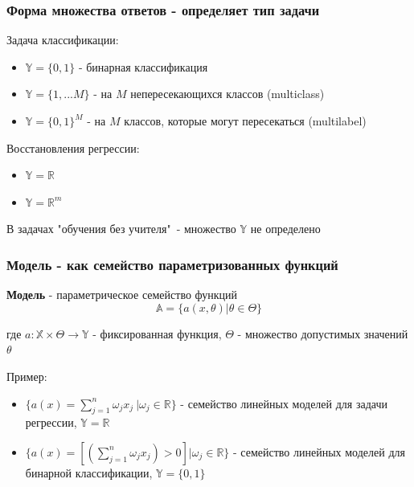 \documentclass{beamer}
\begin{document}
	
	\begin{frame}
		\frametitle{Форма множества ответов - определяет тип задачи}
		
		Задача классификации:
		\begin{itemize}
			\item $\mathbb{Y} = \{0, 1\}$ - бинарная классификация
			\item $\mathbb{Y} = \{1, ... M\}$ - на $M$ непересекающихся классов (multiclass)
			\item $\mathbb{Y} = \{0, 1\}^{M}$ - на $M$ классов, которые могут пересекаться (multilabel)
		\end{itemize}
		
		\vspace{5pt}
		
		Восстановления регрессии:
		\begin{itemize}
			\item $\mathbb{Y} = \mathbb{R}$ 
			\item $\mathbb{Y} = \mathbb{R}^{m}$
		\end{itemize}
	
		\vspace{5pt}
		
		В задачах "обучения без учителя"\ - множество $\mathbb{Y}$ не определено
	\end{frame}


	\begin{frame}
		\frametitle{Модель - как семейство параметризованных функций}
		
		\textbf{Модель} - параметрическое семейство функций
		$$
		\mathbb{A} = \{a(x, \theta) | \theta \in \Theta\}
		$$
		
		где $a: \mathbb{X} \times \Theta \to \mathbb{Y}$ - фиксированная функция,
		$\Theta$ - множество допустимых значений $\theta$
		
		\vspace{15pt}
		
		Пример:
		
		\begin{itemize}
			\item $\{a(x) = \sum_{j=1}^{n} \omega_j x_j\ | \omega_j \in \mathbb{R}\}$ - семейство линейных моделей для задачи регрессии, $\mathbb{Y} = \mathbb{R}$
			
			\item $\{a(x) = [(\sum_{j=1}^{n} \omega_j x_j) > 0] | \omega_j \in \mathbb{R}\}$ - семейство линейных моделей для бинарной классификации, $\mathbb{Y} = \{0, 1\}$
		\end{itemize}
	\end{frame}
\end{document}
